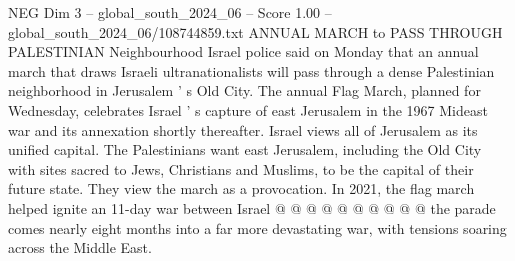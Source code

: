 \begin{textsample}{NEG Dim 3 – global\_south\_2024\_06 – Score 1.00 – global\_south\_2024\_06/108744859.txt}
ANNUAL MARCH to PASS THROUGH PALESTINIAN Neighbourhood Israel police said on Monday that an annual march that draws Israeli ultranationalists will pass through a dense Palestinian neighborhood in Jerusalem ' s Old City.
The annual Flag March, planned for Wednesday, celebrates Israel ' s capture of east Jerusalem in the 1967 Mideast war and its annexation shortly thereafter.
Israel views all of Jerusalem as its unified capital.
The Palestinians want east Jerusalem, including the Old City with sites sacred to Jews, Christians and Muslims, to be the capital of their future state.
They view the march as a provocation.
In 2021, the flag march helped ignite an 11-day war between Israel @ @ @ @ @ @ @ @ @ @ the parade comes nearly eight months into a far more devastating war, with tensions soaring across the Middle East.

\end{textsample}

